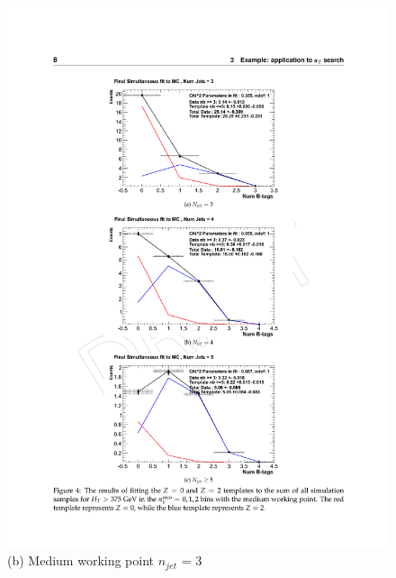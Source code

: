 \begin{figure}[ht]
\begin{minipage}[b]{0.55\linewidth}
\includegraphics[width = 1.0\linewidth]{plots/template_mc_medium_njet3.pdf}
\centering (b) Medium working point $n_{jet}$ = 3 
\end{minipage}
\quad
\begin{minipage}[b]{0.55\linewidth}
\centering

\end{minipage}
\end{figure}
